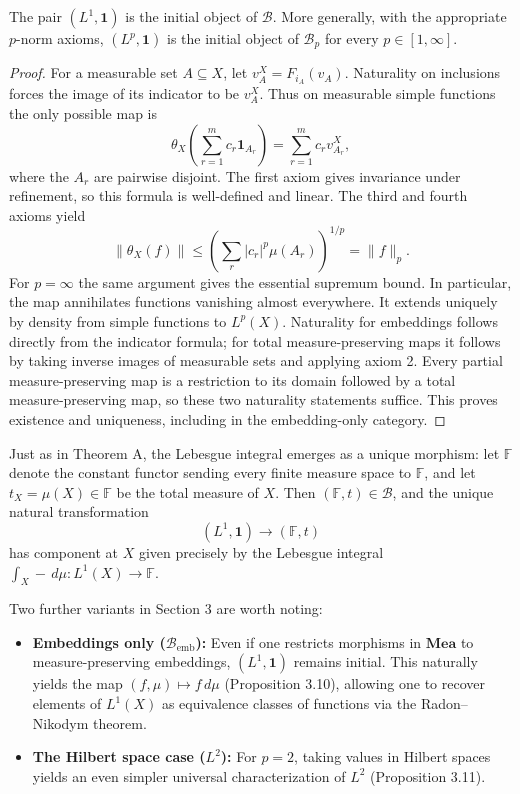 \begin{theorem}
The pair $(L^1, \mathbf{1})$ is the initial object of $\mathcal{B}$. More generally, with the appropriate $p$-norm axioms, $(L^p, \mathbf{1})$ is the initial object of $\mathcal{B}_p$ for every $p \in [1, \infty]$.
\end{theorem}
\begin{proof}
For a measurable set $A\subseteq X$, let $v_A^X=F_{i_A}(v_A)$. Naturality on inclusions forces the image of its indicator to be $v_A^X$. Thus on measurable simple functions the only possible map is
\[
 \theta_X\left(\sum_{r=1}^m c_r\mathbf{1}_{A_r}\right)
       =\sum_{r=1}^m c_r v_{A_r}^X,
\]
where the $A_r$ are pairwise disjoint. The first axiom gives invariance under refinement, so this formula is well-defined and linear. The third and fourth axioms yield
\[
 \|\theta_X(f)\|\leq
 \left(\sum_r |c_r|^p\mu(A_r)\right)^{1/p}=\|f\|_p.
\]
For $p=\infty$ the same argument gives the essential supremum bound. In particular, the map annihilates functions vanishing almost everywhere. It extends uniquely by density from simple functions to $L^p(X)$. Naturality for embeddings follows directly from the indicator formula; for total measure-preserving maps it follows by taking inverse images of measurable sets and applying axiom 2. Every partial measure-preserving map is a restriction to its domain followed by a total measure-preserving map, so these two naturality statements suffice. This proves existence and uniqueness, including in the embedding-only category.
\end{proof}

Just as in Theorem A, the Lebesgue integral emerges as a unique morphism: let $\mathbb{F}$ denote the constant functor sending every finite measure space to $\mathbb{F}$, and let $t_X = \mu(X) \in \mathbb{F}$ be the total measure of $X$. Then $(\mathbb{F}, t) \in \mathcal{B}$, and the unique natural transformation
\[
    (L^1, \mathbf{1}) \longrightarrow (\mathbb{F}, t)
\]
has component at $X$ given precisely by the Lebesgue integral $\int_X - \, d\mu : L^1(X) \to \mathbb{F}$.

Two further variants in Section 3 are worth noting:
\begin{itemize}
    \item \textbf{Embeddings only ($\mathcal{B}_{\mathrm{emb}}$):} Even if one restricts morphisms in $\mathbf{Mea}$ to measure-preserving embeddings, $(L^1, \mathbf{1})$ remains initial. This naturally yields the map $(f, \mu) \mapsto f \, d\mu$ (Proposition 3.10), allowing one to recover elements of $L^1(X)$ as equivalence classes of functions via the Radon--Nikodym theorem.
    \item \textbf{The Hilbert space case ($L^2$):} For $p = 2$, taking values in Hilbert spaces yields an even simpler universal characterization of $L^2$ (Proposition 3.11).
\end{itemize}

